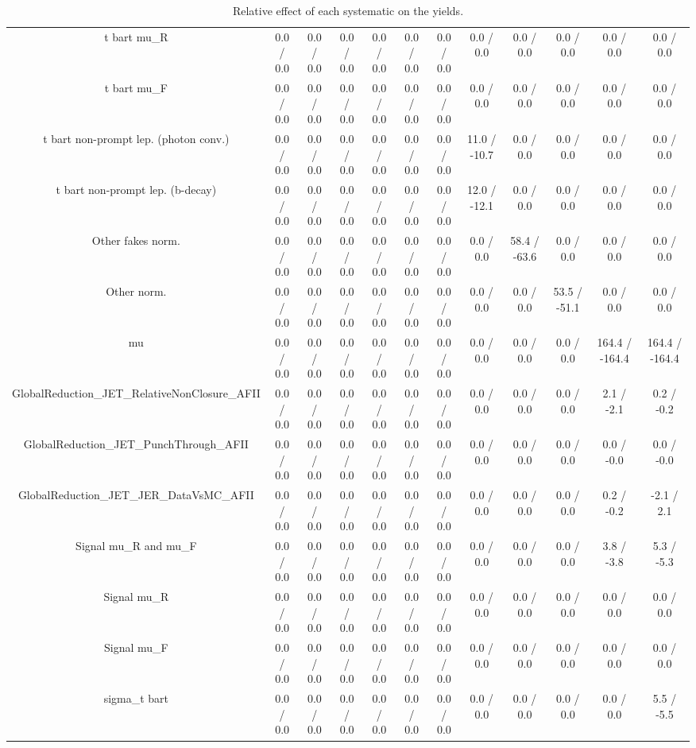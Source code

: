 \begin{table}[htbp]
\begin{center}
\begin{tabular}{|c|c|c|c|c|c|c|c|c|c|c|c|}
  t bar{t}  mu_{R} & 0.0 / 0.0 & 0.0 / 0.0 & 0.0 / 0.0 & 0.0 / 0.0 & 0.0 / 0.0 & 0.0 / 0.0 & 0.0 / 0.0 & 0.0 / 0.0 & 0.0 / 0.0 & 0.0 / 0.0 & 0.0 / 0.0 \\ 
  t bar{t}  mu_{F} & 0.0 / 0.0 & 0.0 / 0.0 & 0.0 / 0.0 & 0.0 / 0.0 & 0.0 / 0.0 & 0.0 / 0.0 & 0.0 / 0.0 & 0.0 / 0.0 & 0.0 / 0.0 & 0.0 / 0.0 & 0.0 / 0.0 \\ 
  t bar{t} non-prompt lep. (photon conv.) & 0.0 / 0.0 & 0.0 / 0.0 & 0.0 / 0.0 & 0.0 / 0.0 & 0.0 / 0.0 & 0.0 / 0.0 & 11.0 / -10.7 & 0.0 / 0.0 & 0.0 / 0.0 & 0.0 / 0.0 & 0.0 / 0.0 \\ 
  t bar{t} non-prompt lep. (b-decay) & 0.0 / 0.0 & 0.0 / 0.0 & 0.0 / 0.0 & 0.0 / 0.0 & 0.0 / 0.0 & 0.0 / 0.0 & 12.0 / -12.1 & 0.0 / 0.0 & 0.0 / 0.0 & 0.0 / 0.0 & 0.0 / 0.0 \\ 
  Other fakes norm. & 0.0 / 0.0 & 0.0 / 0.0 & 0.0 / 0.0 & 0.0 / 0.0 & 0.0 / 0.0 & 0.0 / 0.0 & 0.0 / 0.0 & 58.4 / -63.6 & 0.0 / 0.0 & 0.0 / 0.0 & 0.0 / 0.0 \\ 
  Other norm. & 0.0 / 0.0 & 0.0 / 0.0 & 0.0 / 0.0 & 0.0 / 0.0 & 0.0 / 0.0 & 0.0 / 0.0 & 0.0 / 0.0 & 0.0 / 0.0 & 53.5 / -51.1 & 0.0 / 0.0 & 0.0 / 0.0 \\ 
  mu & 0.0 / 0.0 & 0.0 / 0.0 & 0.0 / 0.0 & 0.0 / 0.0 & 0.0 / 0.0 & 0.0 / 0.0 & 0.0 / 0.0 & 0.0 / 0.0 & 0.0 / 0.0 & 164.4 / -164.4 & 164.4 / -164.4 \\ 
  GlobalReduction_JET_RelativeNonClosure_AFII & 0.0 / 0.0 & 0.0 / 0.0 & 0.0 / 0.0 & 0.0 / 0.0 & 0.0 / 0.0 & 0.0 / 0.0 & 0.0 / 0.0 & 0.0 / 0.0 & 0.0 / 0.0 & 2.1 / -2.1 & 0.2 / -0.2 \\ 
  GlobalReduction_JET_PunchThrough_AFII & 0.0 / 0.0 & 0.0 / 0.0 & 0.0 / 0.0 & 0.0 / 0.0 & 0.0 / 0.0 & 0.0 / 0.0 & 0.0 / 0.0 & 0.0 / 0.0 & 0.0 / 0.0 & 0.0 / -0.0 & 0.0 / -0.0 \\ 
  GlobalReduction_JET_JER_DataVsMC_AFII & 0.0 / 0.0 & 0.0 / 0.0 & 0.0 / 0.0 & 0.0 / 0.0 & 0.0 / 0.0 & 0.0 / 0.0 & 0.0 / 0.0 & 0.0 / 0.0 & 0.0 / 0.0 & 0.2 / -0.2 & -2.1 / 2.1 \\ 
  Signal  mu_{R} and  mu_{F} & 0.0 / 0.0 & 0.0 / 0.0 & 0.0 / 0.0 & 0.0 / 0.0 & 0.0 / 0.0 & 0.0 / 0.0 & 0.0 / 0.0 & 0.0 / 0.0 & 0.0 / 0.0 & 3.8 / -3.8 & 5.3 / -5.3 \\ 
  Signal  mu_{R} & 0.0 / 0.0 & 0.0 / 0.0 & 0.0 / 0.0 & 0.0 / 0.0 & 0.0 / 0.0 & 0.0 / 0.0 & 0.0 / 0.0 & 0.0 / 0.0 & 0.0 / 0.0 & 0.0 / 0.0 & 0.0 / 0.0 \\ 
  Signal  mu_{F} & 0.0 / 0.0 & 0.0 / 0.0 & 0.0 / 0.0 & 0.0 / 0.0 & 0.0 / 0.0 & 0.0 / 0.0 & 0.0 / 0.0 & 0.0 / 0.0 & 0.0 / 0.0 & 0.0 / 0.0 & 0.0 / 0.0 \\ 
   sigma_{t bar{t}} & 0.0 / 0.0 & 0.0 / 0.0 & 0.0 / 0.0 & 0.0 / 0.0 & 0.0 / 0.0 & 0.0 / 0.0 & 0.0 / 0.0 & 0.0 / 0.0 & 0.0 / 0.0 & 0.0 / 0.0 & 5.5 / -5.5 \\ 
\hline 
\end{tabular} 
\caption{Relative effect of each systematic on the yields.} 
\end{center} 
\end{table} 

